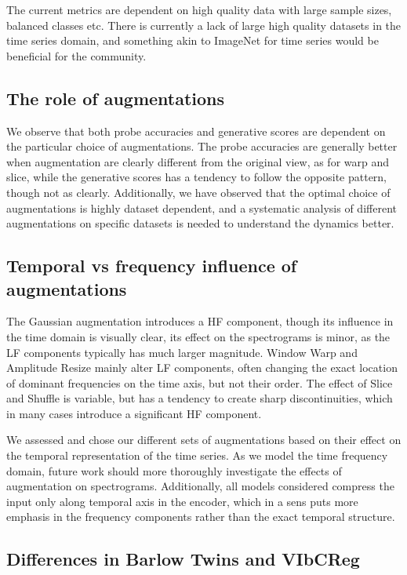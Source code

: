 \documentclass[../../thesis.tex]{subfiles}
\begin{document}
The current metrics are dependent on high quality data with large sample sizes, balanced classes etc. There is currently a lack of large high quality datasets in the time series domain, and something akin to ImageNet for time series would be beneficial for the community. 

\subsection*{The role of augmentations}
We observe that both probe accuracies and generative scores are dependent on the particular choice of augmentations. The probe accuracies are generally better when augmentation are clearly different from the original view, as for warp and slice, while the generative scores has a tendency to follow the opposite pattern, though not as clearly. Additionally, we have observed that the optimal choice of augmentations is highly dataset dependent, and a systematic analysis of different augmentations on specific datasets is needed to understand the dynamics better.

\subsection*{Temporal vs frequency influence of augmentations}

The Gaussian augmentation introduces a HF component, though its influence in the time domain is visually clear, its effect on the spectrograms is minor, as the LF components typically has much larger magnitude. Window Warp and Amplitude Resize mainly alter LF components, often changing the exact location of dominant frequencies on the time axis, but not their order. The effect of Slice and Shuffle is variable, but has a tendency to create sharp discontinuities, which in many cases introduce a significant HF component.\newline

We assessed and chose our different sets of augmentations based on their effect on the temporal representation of the time series. As we model the time frequency domain, future work should more thoroughly investigate the effects of augmentation on spectrograms. Additionally, all models considered compress the input only along temporal axis in the encoder, which in a sens puts more emphasis in the frequency components rather than the exact temporal structure. 

\subsection*{Differences in Barlow Twins and VIbCReg}
\end{document}

